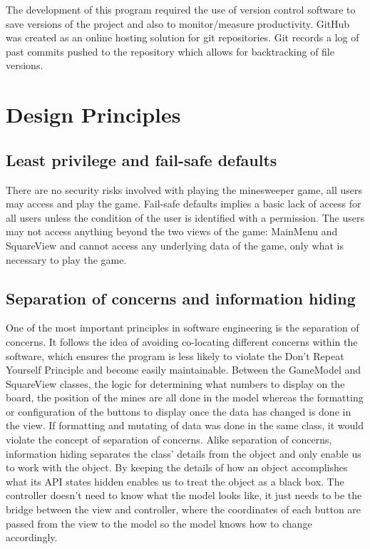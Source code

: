 \documentclass[12pt, a4]{report}
\begin{document}
	The development of this program required the use of version control software to save versions of the project and also to monitor/measure productivity. GitHub was created as an online hosting solution for git repositories. Git records a log of past commits pushed to the repository which allows for backtracking of file versions.
	\section{Design Principles}
	\subsection{Least privilege and fail-safe defaults}
	\par There are no  security risks involved with playing the minesweeper game, all users may access and play the game. Fail-safe defaults implies a basic lack of access for all users
	unless the condition of the user is identified with a permission. The users may not access anything beyond the two views of the game: MainMenu and SquareView and cannot 
	access any underlying data of the game, only what is necessary to play the game. 
	
	\subsection{Separation of concerns and information hiding}
	\par One of the most important principles in software engineering is the separation of concerns. It follows the idea of avoiding co-locating different concerns within the software, which
	ensures the program is less likely to violate the Don't Repeat Yourself Principle and become easily maintainable. 
	Between the GameModel and SquareView classes, the logic for determining what numbers to display on the board, the position of the mines are all done in the model whereas the
	formatting or configuration of the buttons to display once the data has changed is done in the view. If formatting and mutating of data was done in the same class, it would violate
	the concept of separation of concerns. Alike separation of concerns, information hiding separates the class' details from the object and only enable us to work with the object. 
	By keeping the details of how an object accomplishes what its API states hidden enables us to treat the object as a black box. The controller doesn't need to know what the model looks like,
	it just needs to be the bridge between the view and controller, where the coordinates of each button are passed from the view to the model so the model knows how to change accordingly. 
	
\end{document}
